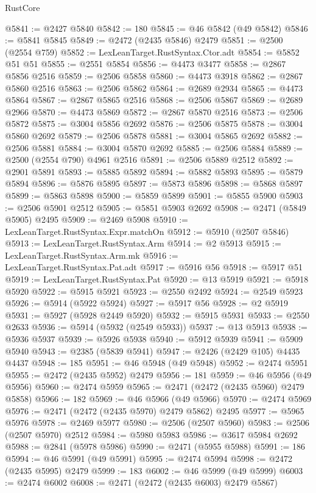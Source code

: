 \begin{lexlean}{RustCore}
\begin{coremodule}
@5841 := @2427 @5840
@5842 := 180
@5845 := @46 @5842 (@49 @5842)
@5846 := @5841 @5845
@5849 := @2472 (@2435 @5846) @2479
@5851 := @2500 (@2554 @759)
@5852 := LexLeanTarget.RustSyntax.Ctor.adt
@5854 := @5852 @51 @51
@5855 := @2551 @5854
@5856 := @4473 @3477
@5858 := @2867 @5856 @2516
@5859 := @2506 @5858
@5860 := @4473 @3918
@5862 := @2867 @5860 @2516
@5863 := @2506 @5862
@5864 := @2689 @2934
@5865 := @4473 @5864
@5867 := @2867 @5865 @2516
@5868 := @2506 @5867
@5869 := @2689 @2966
@5870 := @4473 @5869
@5872 := @2867 @5870 @2516
@5873 := @2506 @5872
@5875 := @3004 @5856 @2692
@5876 := @2506 @5875
@5878 := @3004 @5860 @2692
@5879 := @2506 @5878
@5881 := @3004 @5865 @2692
@5882 := @2506 @5881
@5884 := @3004 @5870 @2692
@5885 := @2506 @5884
@5889 := @2500 (@2554 @790) @4961 @2516
@5891 := @2506 @5889 @2512
@5892 := @2901 @5891
@5893 := @5885 @5892
@5894 := @5882 @5893
@5895 := @5879 @5894
@5896 := @5876 @5895
@5897 := @5873 @5896
@5898 := @5868 @5897
@5899 := @5863 @5898
@5900 := @5859 @5899
@5901 := @5855 @5900
@5903 := @2506 @5901 @2512
@5905 := @5851 @5903 @2692
@5908 := @2471 (@5849 @5905) @2495
@5909 := @2469 @5908
@5910 := LexLeanTarget.RustSyntax.Expr.matchOn
@5912 := @5910 (@2507 @5846)
@5913 := LexLeanTarget.RustSyntax.Arm
@5914 := @2 @5913
@5915 := LexLeanTarget.RustSyntax.Arm.mk
@5916 := LexLeanTarget.RustSyntax.Pat.adt
@5917 := @5916 @56
@5918 := @5917 @51
@5919 := LexLeanTarget.RustSyntax.Pat
@5920 := @13 @5919
@5921 := @5918 @5920
@5922 := @5915 @5921
@5923 := @2550 @2492
@5924 := @2549 @5923
@5926 := @5914 (@5922 @5924)
@5927 := @5917 @56
@5928 := @2 @5919
@5931 := @5927 (@5928 @2449 @5920)
@5932 := @5915 @5931
@5933 := @2550 @2633
@5936 := @5914 (@5932 (@2549 @5933))
@5937 := @13 @5913
@5938 := @5936 @5937
@5939 := @5926 @5938
@5940 := @5912 @5939
@5941 := @5909 @5940
@5943 := @2385 (@5839 @5941)
@5947 := @2426 (@2429 @105) @4435 @4437
@5948 := 185
@5951 := @46 @5948 (@49 @5948)
@5952 := @2474 @5951
@5955 := @2472 (@2435 @5952) @2479
@5956 := 181
@5959 := @46 @5956 (@49 @5956)
@5960 := @2474 @5959
@5965 := @2471 (@2472 (@2435 @5960) @2479 @5858)
@5966 := 182
@5969 := @46 @5966 (@49 @5966)
@5970 := @2474 @5969
@5976 := @2471 (@2472 (@2435 @5970) @2479 @5862) @2495
@5977 := @5965 @5976
@5978 := @2469 @5977
@5980 := @2506 (@2507 @5960)
@5983 := @2506 (@2507 @5970) @2512
@5984 := @5980 @5983
@5986 := @3617 @5984 @2692
@5988 := @2841 (@5978 @5986)
@5990 := @2471 (@5955 @5988)
@5991 := 186
@5994 := @46 @5991 (@49 @5991)
@5995 := @2474 @5994
@5998 := @2472 (@2435 @5995) @2479
@5999 := 183
@6002 := @46 @5999 (@49 @5999)
@6003 := @2474 @6002
@6008 := @2471 (@2472 (@2435 @6003) @2479 @5867)

\end{coremodule}
\end{lexlean}
